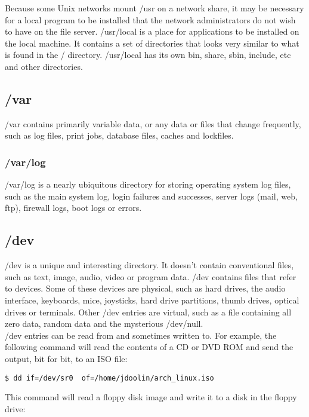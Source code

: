 Because some Unix networks mount /usr on a network share, it may be necessary for a local program to be installed that the network administrators do not wish to have on the file server.  /usr/local is a place for applications to be installed on the local machine.  It contains a set of directories that looks very similar to what is found in the / directory.  /usr/local has its own bin, share, sbin, include, etc and other directories.

\subsection{/var}

/var contains primarily variable data, or any data or files that change frequently, such as log files, print jobs, database files, caches and lockfiles.

\subsubsection{/var/log}

/var/log is a nearly ubiquitous directory for storing operating system log files, such as the main system log, login failures and successes, server logs (mail, web, ftp), firewall logs, boot logs or errors.

\subsection{/dev}

/dev is a unique and interesting directory.  It doesn't contain conventional files, such as text, image, audio, video or program data.  /dev contains files that refer to devices.  Some of these devices are physical, such as hard drives, the audio interface, keyboards, mice, joysticks, hard drive partitions, thumb drives, optical drives or terminals.  Other /dev entries are virtual, such as a file containing all zero data, random data and the mysterious /dev/null.\\

/dev entries can be read from and sometimes written to.  For example, the following command will read the contents of a CD or DVD ROM and send the output, bit for bit, to an ISO file:

\begin{verbatim}
$ dd if=/dev/sr0  of=/home/jdoolin/arch_linux.iso
\end{verbatim}

This command will read a floppy disk image and write it to a disk in the floppy drive:

